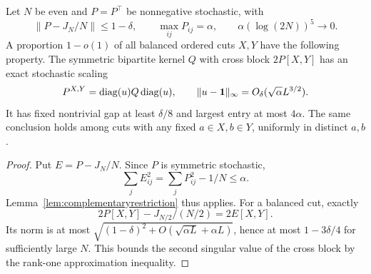 \begin{lemma}
\label{lem:balancedcutscaling}
Let \(N\) be even and \(P=P^\top\) be nonnegative stochastic, with
\[
 \|P-J_N/N\|\leq1-\delta,\qquad \max_{ij}P_{ij}=\alpha,
 \qquad \alpha(\log(2N))^5\to0 .
\]
A proportion \(1-o(1)\) of all balanced ordered cuts \(X,Y\)
have the following property.
The symmetric bipartite kernel \(Q\) with cross block
\(2P[X,Y]\) has an exact stochastic scaling
\[
 P^{X,Y}=\operatorname{diag}(u)Q\operatorname{diag}(u),\qquad
 \|u-\mathbf1\|_\infty=O_\delta(\sqrt{\alpha}L^{3/2}).
\]
It has fixed nontrivial gap at least \(\delta/8\) and largest
entry at most \(4\alpha\).
The same conclusion holds among cuts with any fixed
\(a\in X,b\in Y\), uniformly in distinct \(a,b\).
\end{lemma}
\begin{proof}
Put \(E=P-J_N/N\).
Since \(P\) is symmetric stochastic,
\[
 \sum_j E_{ij}^2=\sum_jP_{ij}^2-1/N\leq\alpha .
\]
Lemma~\ref{lem:complementaryrestriction} thus applies.
For a balanced cut, exactly
\[
 2P[X,Y]-J_{N/2}/(N/2)=2E[X,Y].
\]
Its norm is at most
\(\sqrt{(1-\delta)^2+O(\sqrt{\alpha L}+\alpha L)}\),
hence at most \(1-3\delta/4\) for sufficiently large \(N\).
This bounds the second singular value of the cross block
by the rank-one approximation inequality.


\end{proof}
